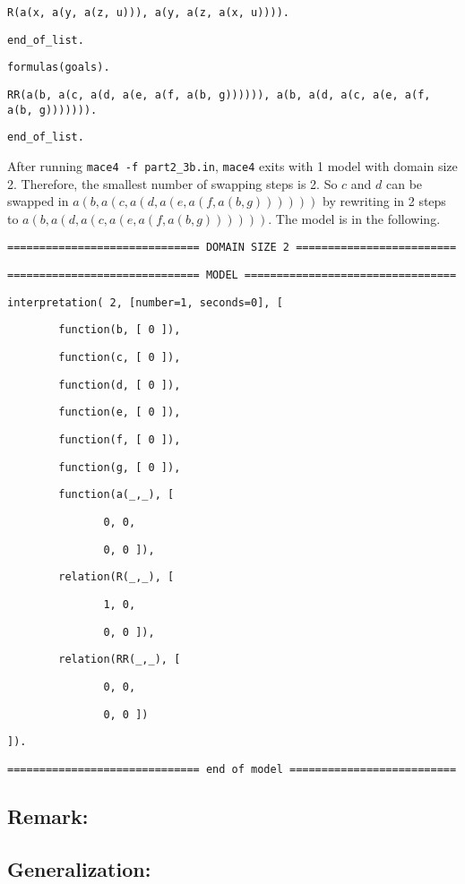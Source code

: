 \begin{description}
{%

{\tt R(a(x, a(y, a(z, u))), a(y, a(z, a(x, u)))).}

{\tt end\_of\_list.}

{\tt formulas(goals).}

{\tt RR(a(b, a(c, a(d, a(e, a(f, a(b, g)))))), a(b, a(d, a(c, a(e, a(f, a(b, g))))))).}

{\tt end\_of\_list.  }

  }

\vspace{2mm}

  After running {\tt mace4 -f  part2\_3b.in}, {\tt mace4} exits with 1 model with domain size 2. Therefore, the smallest number of swapping steps is 2. So $c$ and $d$ can be swapped in $a(b, a(c, a(d, a(e, a(f, a(b, g))))))$ by rewriting in 2 steps to $a(b, a(d, a(c, a(e, a(f, a(b, g))))))$. The model is in the following.
  
{\footnotesize

{\tt ============================== DOMAIN SIZE 2 =========================}

{\tt ============================== MODEL =================================}

{\tt interpretation( 2, [number=1, seconds=0], [}

{\tt \ \ \ \ \ \ \ \         function(b, [ 0 ]),}

{\tt \ \ \ \ \ \ \ \         function(c, [ 0 ]),}

{\tt \ \ \ \ \ \ \ \         function(d, [ 0 ]),}

{\tt \ \ \ \ \ \ \ \         function(e, [ 0 ]),}

{\tt \ \ \ \ \ \ \ \         function(f, [ 0 ]),}

{\tt \ \ \ \ \ \ \ \         function(g, [ 0 ]),}

{\tt \ \ \ \ \ \ \ \         function(a(\_,\_), [}

{\tt \	\	\	\ \ \ \	\	\	\ \ \ \ \ \ 			   0, 0,}

{\tt \	\	\	\ \ \ \	\	\	\ \ \ \ \ \ 			   0, 0 ]),}

{\tt \ \ \ \ \ \ \ \         relation(R(\_,\_), [}

{\tt \	\	\	\ \ \ \	\	\	\ \ \ \ \ \ 			   1, 0,}

{\tt \	\	\	\ \ \ \	\	\	\ \ \ \ \ \ 			   0, 0 ]),}

{\tt \ \ \ \ \ \ \ \         relation(RR(\_,\_), [}

{\tt \	\	\	\ \ \ \	\	\	\ \ \ \ \ \ 			   0, 0,}

{\tt \	\	\	\ \ \ \	\	\	\ \ \ \ \ \ 			   0, 0 ])}

{\tt ]).}

{\tt ============================== end of model ==========================}

}

\end{description}

\subsection*{Remark:}


\subsection*{Generalization:}




